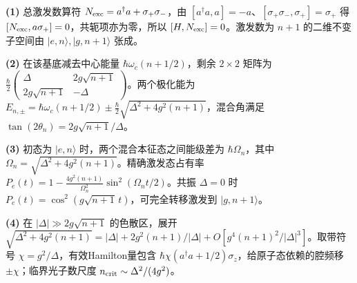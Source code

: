 \par\noindent\textbf{(1)} 总激发数算符 \(N_{\rm exc}=a^\dagger a+\sigma_+\sigma_-\)，由 \([a^\dagger a,a]=-a\)、\([\sigma_+\sigma_-,\sigma_+]=\sigma_+\) 得 \([N_{\rm exc},a\sigma_+]=0\)，共轭项亦为零，所以 \([H,N_{\rm exc}]=0\)。激发数为 \(n+1\) 的二维不变子空间由 \(|e,n\rangle,|g,n+1\rangle\) 张成。
\par\noindent\textbf{(2)} 在该基底减去中心能量 \(\hbar\omega_c(n+1/2)\)，剩余 \(2\times2\) 矩阵为 \(\frac\hbar2\begin{pmatrix}\Delta&2g\sqrt{n+1}\\2g\sqrt{n+1}&-\Delta\end{pmatrix}\)。两个极化能为 \(E_{n,\pm}=\hbar\omega_c(n+1/2)\pm\frac\hbar2\sqrt{\Delta^2+4g^2(n+1)}\)，混合角满足 \(\tan(2\theta_n)=2g\sqrt{n+1}/\Delta\)。
\par\noindent\textbf{(3)} 初态为 \(|e,n\rangle\) 时，两个混合本征态之间能级差为 \(\hbar\Omega_n\)，其中 \(\Omega_n=\sqrt{\Delta^2+4g^2(n+1)}\)。精确激发态占有率 \(P_e(t)=1-\frac{4g^2(n+1)}{\Omega_n^2}\sin^2(\Omega_nt/2)\)。共振 \(\Delta=0\) 时 \(P_e(t)=\cos^2(g\sqrt{n+1}\,t)\)，可完全转移激发到 \(|g,n+1\rangle\)。
\par\noindent\textbf{(4)} 在 \(|\Delta|\gg2g\sqrt{n+1}\) 的色散区，展开 \(\sqrt{\Delta^2+4g^2(n+1)}=|\Delta|+2g^2(n+1)/|\Delta|+O[g^4(n+1)^2/|\Delta|^3]\)。取带符号 \(\chi=g^2/\Delta\)，有效Hamilton量包含 \(\hbar\chi(a^\dagger a+1/2)\sigma_z\)，给原子态依赖的腔频移 \(\pm\chi\)；临界光子数尺度 \(n_{\rm crit}\sim\Delta^2/(4g^2)\)。
